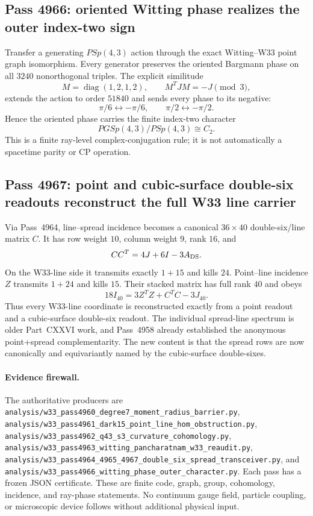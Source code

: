 \subsection{Pass 4966: oriented Witting phase realizes the outer index-two sign}
Transfer a generating $PSp(4,3)$ action through the exact Witting--W33 point
graph isomorphism.  Every generator preserves the oriented Bargmann phase on
all $3240$ nonorthogonal triples.  The explicit similitude
\[
M=\operatorname{diag}(1,2,1,2),\qquad M^TJM=-J\pmod3,
\]
extends the action to order $51840$ and sends every phase to its negative:
\[
\pi/6\leftrightarrow-\pi/6,
\qquad
\pi/2\leftrightarrow-\pi/2.
\]
Hence the oriented phase carries the finite index-two character
\[
\boxed{PGSp(4,3)/PSp(4,3)\cong C_2}.
\]
This is a finite ray-level complex-conjugation rule; it is not automatically a
spacetime parity or CP operation.

\subsection{Pass 4967: point and cubic-surface double-six readouts reconstruct the full W33 line carrier}
Via Pass~4964, line--spread incidence becomes a canonical
$36\times40$ double-six/line matrix $C$.  It has row weight $10$, column weight
$9$, rank $16$, and
\[
CC^T=4J+6I-3A_{\rm DS}.
\]
On the W33-line side it transmits exactly $1+15$ and kills $24$.  Point--line
incidence $Z$ transmits $1+24$ and kills $15$.  Their stacked matrix has full
rank $40$ and obeys
\[
\boxed{18I_{40}=3Z^TZ+C^TC-3J_{40}}.
\]
Thus every W33-line coordinate is reconstructed exactly from a point readout
and a cubic-surface double-six readout.  The individual spread-line spectrum is
older Part~CXXVI work, and Pass~4958 already established the anonymous
point+spread complementarity.  The new content is that the spread rows are now
canonically and equivariantly named by the cubic-surface double-sixes.

\paragraph{Evidence firewall.}
The authoritative producers are
\texttt{analysis/w33\_pass4960\_degree7\_moment\_radius\_barrier.py},
\texttt{analysis/w33\_pass4961\_dark15\_point\_line\_hom\_obstruction.py},
\texttt{analysis/w33\_pass4962\_q43\_s3\_curvature\_cohomology.py},
\texttt{analysis/w33\_pass4963\_witting\_pancharatnam\_w33\_reaudit.py},
\texttt{analysis/w33\_pass4964\_4965\_4967\_double\_six\_spread\_transceiver.py},
and
\texttt{analysis/w33\_pass4966\_witting\_phase\_outer\_character.py}.
Each pass has a frozen JSON certificate.  These are finite code, graph, group,
cohomology, incidence, and ray-phase statements.  No continuum gauge field,
particle coupling, or microscopic device follows without additional physical
input.
